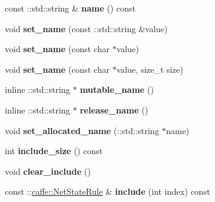 \begin{DoxyCompactItemize}
const \+::std\+::string \& {\bfseries name} () const
\item 
\mbox{\label{classcaffe_1_1_v1_layer_parameter_ab0fbc90c622644e9dd18c537fe05baf3}} 
void {\bfseries set\+\_\+name} (const \+::std\+::string \&value)
\item 
\mbox{\label{classcaffe_1_1_v1_layer_parameter_a98799e189819443a33eb9022e4102abb}} 
void {\bfseries set\+\_\+name} (const char $\ast$value)
\item 
\mbox{\label{classcaffe_1_1_v1_layer_parameter_a3bd6a09615b3ef6fd7bb6632062b0004}} 
void {\bfseries set\+\_\+name} (const char $\ast$value, size\+\_\+t size)
\item 
\mbox{\label{classcaffe_1_1_v1_layer_parameter_afb328ea5997048a0d06640b7a561d616}} 
inline \+::std\+::string $\ast$ {\bfseries mutable\+\_\+name} ()
\item 
\mbox{\label{classcaffe_1_1_v1_layer_parameter_ade931b3c630e030bf1512288dce03f2d}} 
inline \+::std\+::string $\ast$ {\bfseries release\+\_\+name} ()
\item 
\mbox{\label{classcaffe_1_1_v1_layer_parameter_a514f213b4d9147e23ec131151f5aa459}} 
void {\bfseries set\+\_\+allocated\+\_\+name} (\+::std\+::string $\ast$name)
\item 
\mbox{\label{classcaffe_1_1_v1_layer_parameter_ae08c2ff2eb2712772862d1cb7d159c97}} 
int {\bfseries include\+\_\+size} () const
\item 
\mbox{\label{classcaffe_1_1_v1_layer_parameter_ab3adf42bfa782aa442f57bc79a80384b}} 
void {\bfseries clear\+\_\+include} ()
\item 
\mbox{\label{classcaffe_1_1_v1_layer_parameter_a430ec20fbc0a36db680acb5d3953eac7}} 
const \+::\mbox{\hyperlink{classcaffe_1_1_net_state_rule}{caffe\+::\+Net\+State\+Rule}} \& {\bfseries include} (int index) const
\item 

\end{DoxyCompactItemize}
